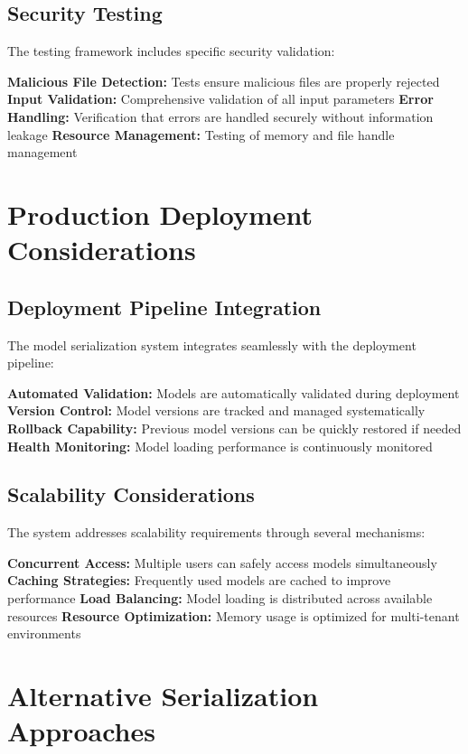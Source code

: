 \subsection{Security Testing}

The testing framework includes specific security validation:

\textbf{Malicious File Detection:} Tests ensure malicious files are properly rejected
\textbf{Input Validation:} Comprehensive validation of all input parameters
\textbf{Error Handling:} Verification that errors are handled securely without information leakage
\textbf{Resource Management:} Testing of memory and file handle management

\section{Production Deployment Considerations}

\subsection{Deployment Pipeline Integration}

The model serialization system integrates seamlessly with the deployment pipeline:

\textbf{Automated Validation:} Models are automatically validated during deployment
\textbf{Version Control:} Model versions are tracked and managed systematically
\textbf{Rollback Capability:} Previous model versions can be quickly restored if needed
\textbf{Health Monitoring:} Model loading performance is continuously monitored

\subsection{Scalability Considerations}

The system addresses scalability requirements through several mechanisms:

\textbf{Concurrent Access:} Multiple users can safely access models simultaneously
\textbf{Caching Strategies:} Frequently used models are cached to improve performance
\textbf{Load Balancing:} Model loading is distributed across available resources
\textbf{Resource Optimization:} Memory usage is optimized for multi-tenant environments

\section{Alternative Serialization Approaches}

